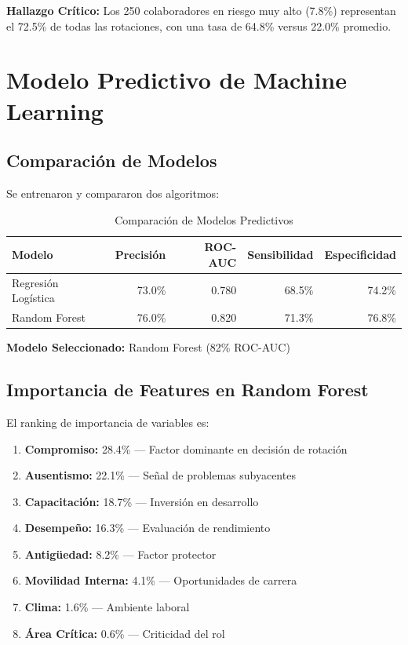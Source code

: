 \documentclass[11pt,a4paper,twoside]{article}
\begin{document}
\textbf{Hallazgo Crítico:} Los 250 colaboradores en riesgo muy alto (7.8\%) representan el 72.5\% de todas las rotaciones, con una tasa de 64.8\% versus 22.0\% promedio.

\newpage

\section{Modelo Predictivo de Machine Learning}

\subsection{Comparación de Modelos}

Se entrenaron y compararon dos algoritmos:

\begin{table}[H]
    \centering
    \caption{Comparación de Modelos Predictivos}
    \begin{tabular}{|l|r|r|r|r|}
        \toprule
        \textbf{Modelo} & \textbf{Precisión} & \textbf{ROC-AUC} & \textbf{Sensibilidad} & \textbf{Especificidad} \\
        \midrule
        Regresión Logística & 73.0\% & 0.780 & 68.5\% & 74.2\% \\
        Random Forest & 76.0\% & 0.820 & 71.3\% & 76.8\% \\
        \bottomrule
    \end{tabular}
\end{table}

\textbf{Modelo Seleccionado:} Random Forest (82\% ROC-AUC)

\subsection{Importancia de Features en Random Forest}

El ranking de importancia de variables es:

\begin{enumerate}
    \item \textbf{Compromiso:} 28.4\% — Factor dominante en decisión de rotación
    \item \textbf{Ausentismo:} 22.1\% — Señal de problemas subyacentes
    \item \textbf{Capacitación:} 18.7\% — Inversión en desarrollo
    \item \textbf{Desempeño:} 16.3\% — Evaluación de rendimiento
    \item \textbf{Antigüedad:} 8.2\% — Factor protector
    \item \textbf{Movilidad Interna:} 4.1\% — Oportunidades de carrera
    \item \textbf{Clima:} 1.6\% — Ambiente laboral
    \item \textbf{Área Crítica:} 0.6\% — Criticidad del rol
\end{enumerate}
\end{document}
